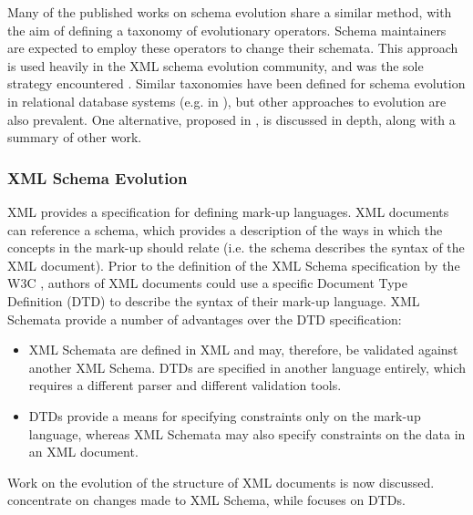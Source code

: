 Many of the published works on schema evolution share a similar method, with the aim of defining a taxonomy of evolutionary operators. Schema maintainers are expected to employ these operators to change their schemata. This approach is used heavily in the XML schema evolution community, and was the sole strategy encountered \cite{guerrini05impact,kramer01xem,su01xem}. Similar taxonomies have been defined for schema evolution in relational database systems (e.g. in \cite{banerjee87semantics,edelweiss05temporal}), but other approaches to evolution are also prevalent. One alternative, proposed in \cite{lerner00model}, is discussed in depth, along with a summary of other work.


\subsubsection{XML Schema Evolution}
\label{LitReview:XmlSchemaEvo}
XML provides a specification for defining mark-up languages. XML documents can reference a schema, which provides a description of the ways in which the concepts in the mark-up should relate (i.e. the schema describes the syntax of the XML document). Prior to the definition of the XML Schema specification \cite{xmlschema} by the W3C \cite{w3c}, authors of XML documents could use a specific Document Type Definition (DTD) to describe the syntax of their mark-up language. XML Schemata provide a number of advantages over the DTD specification:

\begin{itemize}
 \item XML Schemata are defined in XML and may, therefore, be validated against another XML Schema. DTDs are specified in another language entirely, which requires a different parser and different validation tools.
 \item DTDs provide a means for specifying constraints only on the mark-up language, whereas XML Schemata may also specify constraints on the data in an XML document.
\end{itemize}

Work on the evolution of the structure of XML documents is now discussed. \cite{guerrini05impact} concentrate on changes made to XML Schema, while \cite{kramer01xem} focuses on DTDs.


